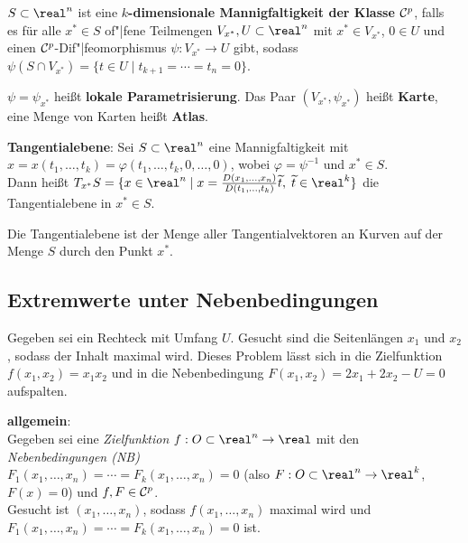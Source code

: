 \linie

$S \subset \real^n$ ist eine
\textbf{$k$-dimensionale Mannigfaltigkeit der Klasse $\mathcal{C}^p$}, falls \\
es für alle $x^\ast \in S$ of"|fene Teilmengen $V_{x^\ast}, U \subset \real^n$
mit $x^\ast \in V_{x^\ast}$, $0 \in U$ und einen $\mathcal{C}^p$-Dif"|feomorphismus
$\psi: V_{x^\ast} \rightarrow U$ gibt, sodass
$\psi(S \cap V_{x^\ast}) = \{t \in U \;|\; t_{k+1} = \dotsb = t_n = 0\}$.

$\psi = \psi_{x^\ast}$ heißt \textbf{lokale Parametrisierung}.
Das Paar $(V_{x^\ast}, \psi_{x^\ast})$ heißt \textbf{Karte}, eine Menge von
Karten heißt \textbf{Atlas}.

\linie

\textbf{Tangentialebene}:
Sei $S \subset \real^n$ eine Mannigfaltigkeit mit \\
$x = x(t_1, \dotsc, t_k) = \varphi(t_1, \dotsc, t_k, 0, \dotsc, 0)$, wobei
$\varphi = \psi^{-1}$ und $x^\ast \in S$. \\
Dann heißt $T_{x^\ast} S = \{x \in \real^n \;|\; x =
\frac{D(x_1, \dotsc, x_n)}{D(t_1, \dotsc, t_k)} \widetilde{t},\;
\widetilde{t} \in \real^k\}$
die Tangentialebene in $x^\ast \in S$.

Die Tangentialebene ist der Menge aller Tangentialvektoren an Kurven
auf der Menge $S$ durch den Punkt $x^\ast$.


\pagebreak

\subsection{%
    Extremwerte unter Nebenbedingungen%
}

Gegeben sei ein Rechteck mit Umfang $U$.
Gesucht sind die Seitenlängen $x_1$ und $x_2$, sodass der Inhalt maximal wird.
Dieses Problem lässt sich in die Zielfunktion $f(x_1, x_2) = x_1 x_2$ und
in die Nebenbedingung $F(x_1, x_2) = 2x_1 + 2x_2 - U = 0$ aufspalten.

\linie

\textbf{allgemein}: \\
Gegeben sei eine \emph{Zielfunktion} $f: O \subset \real^n \rightarrow \real$
mit den \emph{Nebenbedingungen (NB)} \\
$F_1(x_1, \dotsc, x_n) = \dotsb = F_k(x_1, \dotsc, x_n) = 0$
(also $F: O \subset \real^n \rightarrow \real^k$, $F(x) = 0$)
und $f, F \in \mathcal{C}^p$. \\
Gesucht ist $(x_1, \dotsc, x_n)$, sodass $f(x_1, \dotsc, x_n)$ maximal wird
und \\
$F_1(x_1, \dotsc, x_n) = \dotsb = F_k(x_1, \dotsc, x_n) = 0$ ist.

